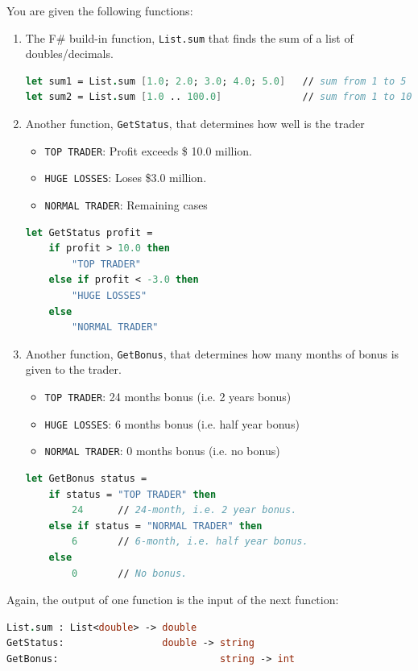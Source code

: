 \documentclass[12pt]{article}
\begin{document}
You are given the following functions:
\begin{enumerate}
\item The F\# build-in function, \texttt{List.sum} that finds the sum of a list of doubles/decimals.
\begin{lstlisting}[language=FSharp]
let sum1 = List.sum [1.0; 2.0; 3.0; 4.0; 5.0]   // sum from 1 to 5
let sum2 = List.sum [1.0 .. 100.0]              // sum from 1 to 100
\end{lstlisting}
\item Another function, \texttt{GetStatus}, that determines how well is the trader
\begin{itemize}
\item \texttt{TOP TRADER}: Profit exceeds \$ 10.0 million.
\item \texttt{HUGE LOSSES}: Loses \$3.0 million.
\item \texttt{NORMAL TRADER}: Remaining cases
\end{itemize}
\begin{lstlisting}[language=FSharp]
let GetStatus profit =
    if profit > 10.0 then
        "TOP TRADER"
    else if profit < -3.0 then
        "HUGE LOSSES"
    else
        "NORMAL TRADER"
\end{lstlisting}
\item Another function, \texttt{GetBonus}, that determines how many months of bonus is given to the trader.
\begin{itemize}
\item \texttt{TOP TRADER}: 24 months bonus (i.e. 2 years bonus)
\item \texttt{HUGE LOSSES}: 6 months bonus (i.e. half year bonus)
\item \texttt{NORMAL TRADER}: 0 months bonus (i.e. no bonus)
\end{itemize}
\begin{lstlisting}[language=FSharp]
let GetBonus status =
    if status = "TOP TRADER" then   
        24      // 24-month, i.e. 2 year bonus.
    else if status = "NORMAL TRADER" then
        6       // 6-month, i.e. half year bonus.
    else 
        0       // No bonus.
\end{lstlisting}
\pagebreak
\end{enumerate}
Again, the output of one function is the input of the next function:
\begin{lstlisting}[language=FSharp]
List.sum : List<double> -> double
GetStatus:                 double -> string
GetBonus:                            string -> int
\end{lstlisting}
\end{document}

